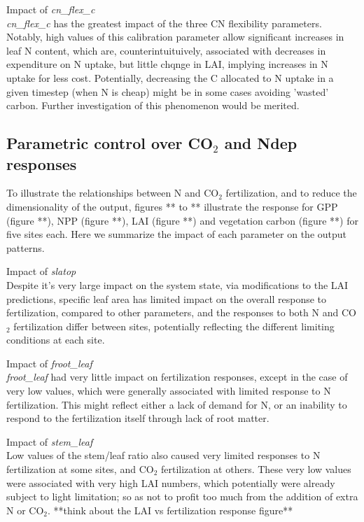 \documentclass[draft,linenumbers]{agujournal}
\begin{document}
Impact of \emph{cn\_flex\_c}\\
\emph{cn\_flex\_c} has the greatest impact of the three CN flexibility parameters. Notably, high values of this calibration parameter allow significant increases in leaf N content, which are, counterintuituively, associated with decreases in expenditure on N uptake, but little chqnge in LAI, implying increases in N uptake for less cost. Potentially, decreasing the C allocated to N uptake in a given timestep (when N is cheap) might be in some cases avoiding 'wasted' carbon. Further investigation of this phenomenon would be merited.


\subsection{Parametric control over CO$_{2}$ and Ndep responses}
To illustrate the relationships between N and CO$_{2}$ fertilization, and to reduce the dimensionality of the output, figures ** to ** illustrate the response for GPP (figure **), NPP (figure **), LAI (figure **) and vegetation carbon (figure **) for five sites each. Here we summarize the impact of each parameter on the output patterns. 

Impact of \emph{slatop}\\
Despite it’s very large impact on the system state, via modifications to the LAI predictions, specific leaf area has limited impact on the overall response to fertilization, compared to other parameters, and the responses to both N and CO$_{2}$ fertilization differ between sites, potentially reflecting the different limiting conditions at each site.  

Impact of \emph{froot\_leaf}\\
\emph{froot\_leaf} had very little impact on fertilization responses, except in the case of very low values, which were generally associated with limited response to N fertilization. This might reflect either a lack of demand for N, or an inability to respond to the fertilization itself through lack of root matter. 

Impact of \emph{stem\_leaf}\\
Low values of the stem/leaf ratio also caused very limited responses to N fertilization at some sites, and CO$_{2}$ fertilization at others. These very low values were associated with very high LAI numbers, which potentially were already subject to light limitation; so as not to profit too much from the addition of extra N or CO$_{2}$. **think about the LAI vs fertilization response figure**
\end{document}
